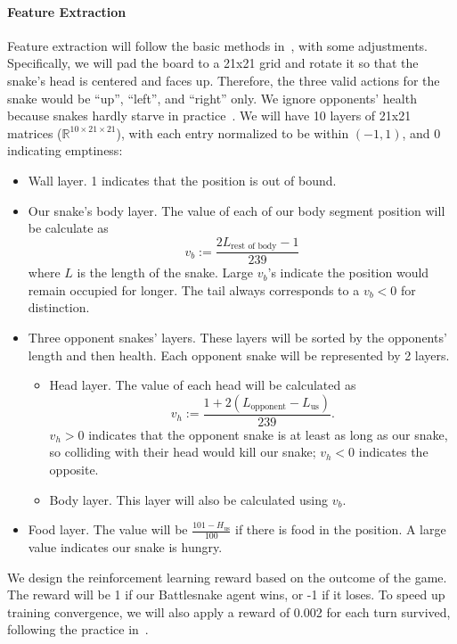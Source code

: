 \documentclass[conference]{IEEEtran}
\begin{document}
\paragraph{Feature Extraction}
Feature extraction will follow the basic methods
in~\cite{siddiqui2020multiagent,archinukmonte}, with some adjustments.
Specifically,
we will pad the board to a 21x21 grid and rotate it so that the snake's head is
centered and faces up. Therefore,
the three valid actions for the snake would be ``up'', ``left'',
and ``right'' only.
We ignore opponents' health because snakes hardly starve in
practice~\cite{siddiqui2020multiagent}.
We will have 10 layers of 21x21 matrices ($\mathbb R^{10\times21\times21}$),
with each entry normalized to be within $(-1,1)$, and 0 indicating emptiness:
\begin{itemize}
    \item Wall layer. 1 indicates that the position is out of bound.
    \item Our snake's body layer.
        The value of each of our body segment position will be calculate as $$
            v_b:=\frac{2L_{\text{rest of body}}-1}{239}
        $$ where $L$ is the length of the snake.
        Large $v_b$'s indicate the position would remain occupied for longer.
        The tail always corresponds to a $v_b<0$ for distinction.
    \item Three opponent snakes' layers.
          These layers will be sorted by the opponents' length and then health.
          Each opponent snake will be represented by 2 layers. \begin{itemize}
              \item Head layer. The value of each head will be calculated as $$
                        v_h:=\frac{1+2(L_{\text{opponent}}-L_{\text{us}})}{239}.
                    $$ $v_h>0$ indicates that the opponent snake is at least as
                    long as our snake,
                    so colliding with their head would kill our snake;
                    $v_h<0$ indicates the opposite.
              \item Body layer. This layer will also be calculated using $v_b$.
          \end{itemize}
    \item Food layer.
          The value will be $\displaystyle\frac{101-H_{\text{us}}}{100}$ if
          there is food in the position.
          A large value indicates our snake is hungry.
\end{itemize}

We design the reinforcement learning reward based on the outcome of the game.
The reward will be 1 if our Battlesnake agent wins, or -1 if it loses.
To speed up training convergence,
we will also apply a reward of 0.002 for each turn survived,
following the practice in~\cite{chung2020battlesnake}.
\end{document}
